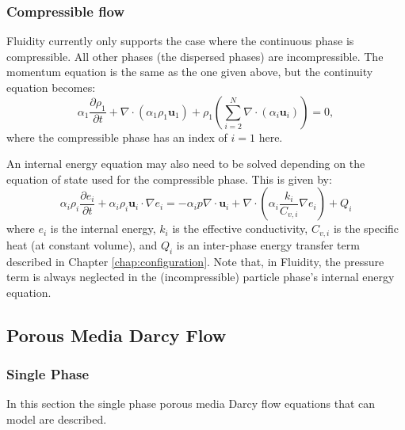 \subsubsection{Compressible flow}
Fluidity currently only supports the case where the continuous phase is compressible. All other phases (the dispersed phases) are incompressible. The momentum equation is the same as the one given above, but the continuity equation becomes:
\begin{equation}
\alpha_1\frac{\partial\rho_1}{\partial t} + \nabla\cdot\left(\alpha_1\rho_1\mathbf{u}_1\right) + \rho_1\left(\sum_{i=2}^N\nabla\cdot\left(\alpha_i\mathbf{u}_i\right)\right) = 0,
\end{equation}
where the compressible phase has an index of $i=1$ here.

An internal energy equation may also need to be solved depending on the equation of state used for the compressible phase. This is given by:
\begin{equation}
\alpha_i\rho_i\frac{\partial e_i}{\partial t} + \alpha_i\rho_i\mathbf{u}_i\cdot\nabla e_i = -\alpha_i p\nabla\cdot\mathbf{u}_i + \nabla\cdot\left(\alpha_i\frac{k_i}{C_{v,i}}\nabla e_i\right) + Q_i
\end{equation}
where $e_i$ is the internal energy, $k_i$ is the effective conductivity, $C_{v,i}$ is the specific heat (at constant volume), and $Q_i$ is an inter-phase energy transfer term described in Chapter \ref{chap:configuration}. Note that, in Fluidity, the pressure term is always neglected in the (incompressible) particle phase's internal energy equation.

\subsection{Porous Media Darcy Flow}
\label{sec:porous_media_darcy_flow_equations}

\subsubsection{Single Phase}

In this section the single phase porous media Darcy flow equations that \fluidity can model are described.

